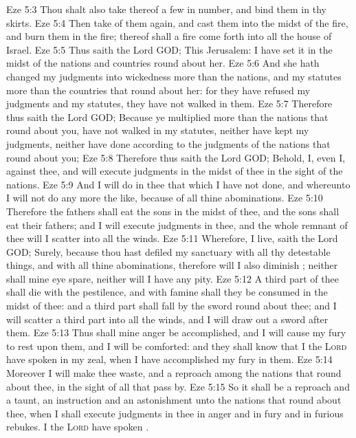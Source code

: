 \vs Eze 5:3 Thou shalt also take thereof a few in number, and bind them in thy skirts.
\vs Eze 5:4 Then take of them again, and cast them into the midst of the fire, and burn them in the fire;  thereof shall a fire come forth into all the house of Israel.
\vs Eze 5:5 Thus saith the Lord GOD; This  Jerusalem: I have set it in the midst of the nations and countries  round about her.
\vs Eze 5:6 And she hath changed my judgments into wickedness more than the nations, and my statutes more than the countries that  round about her: for they have refused my judgments and my statutes, they have not walked in them.
\vs Eze 5:7 Therefore thus saith the Lord GOD; Because ye multiplied more than the nations that  round about you,  have not walked in my statutes, neither have kept my judgments, neither have done according to the judgments of the nations that  round about you;
\vs Eze 5:8 Therefore thus saith the Lord GOD; Behold, I, even I,  against thee, and will execute judgments in the midst of thee in the sight of the nations.
\vs Eze 5:9 And I will do in thee that which I have not done, and whereunto I will not do any more the like, because of all thine abominations.
\vs Eze 5:10 Therefore the fathers shall eat the sons in the midst of thee, and the sons shall eat their fathers; and I will execute judgments in thee, and the whole remnant of thee will I scatter into all the winds.
\vs Eze 5:11 Wherefore,  I live, saith the Lord GOD; Surely, because thou hast defiled my sanctuary with all thy detestable things, and with all thine abominations, therefore will I also diminish ; neither shall mine eye spare, neither will I have any pity.
\vs Eze 5:12 A third part of thee shall die with the pestilence, and with famine shall they be consumed in the midst of thee: and a third part shall fall by the sword round about thee; and I will scatter a third part into all the winds, and I will draw out a sword after them.
\vs Eze 5:13 Thus shall mine anger be accomplished, and I will cause my fury to rest upon them, and I will be comforted: and they shall know that I the \textsc{Lord} have spoken  in my zeal, when I have accomplished my fury in them.
\vs Eze 5:14 Moreover I will make thee waste, and a reproach among the nations that  round about thee, in the sight of all that pass by.
\vs Eze 5:15 So it shall be a reproach and a taunt, an instruction and an astonishment unto the nations that  round about thee, when I shall execute judgments in thee in anger and in fury and in furious rebukes. I the \textsc{Lord} have spoken .
